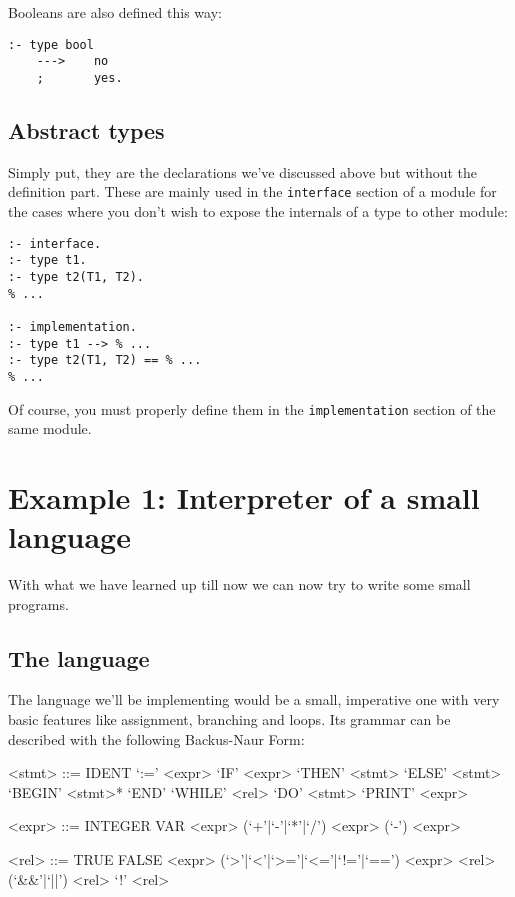   Booleans are also defined this way:

\begin{lstlisting}[language=Mercury]
% in module `bool`
:- type bool
    --->    no
    ;       yes.
\end{lstlisting}

\subsection{Abstract types}

Simply put, they are the declarations we've discussed above but without the definition part. These are mainly used in the \texttt{interface} section of a module for the cases where you don't wish to expose the internals of a type to other module:

\begin{lstlisting}[language=Mercury]
:- interface.
:- type t1.
:- type t2(T1, T2).
% ...

:- implementation.
:- type t1 --> % ...
:- type t2(T1, T2) == % ...
% ...
\end{lstlisting}

Of course, you must properly define them in the \texttt{implementation} section of the same module.

\section{Example 1: Interpreter of a small language}

With what we have learned up till now we can now try to write some small programs.

\subsection{The language}

The language we'll be implementing would be a small, imperative one with very basic features like assignment, branching and loops. Its grammar can be described with the following Backus-Naur Form:

\begin{grammar}
  <stmt> ::= IDENT `:=' <expr>
  \alt `IF' <expr> `THEN' <stmt> `ELSE' <stmt>
  \alt `BEGIN' <stmt>* `END'
  \alt `WHILE' <rel> `DO' <stmt>
  \alt `PRINT' <expr>

  <expr> ::= INTEGER
  \alt VAR
  \alt <expr> (`+'|`-'|`*'|`/') <expr>
  \alt (`-') <expr>

  <rel> ::= TRUE
  \alt FALSE
  \alt <expr> (`>'|`<'|`>='|`<='|`!='|`==') <expr>
  \alt <rel> (`\&\&'|`||') <rel>
  \alt `!' <rel>
\end{grammar}

